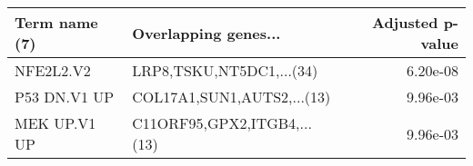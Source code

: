 \begin{tabular}{llr}
\toprule
Term name (7) &        Overlapping genes... &  Adjusted p-value \\
\midrule
    NFE2L2.V2 &    LRP8,TSKU,NT5DC1,...(34) &          6.20e-08 \\
 P53 DN.V1 UP &  COL17A1,SUN1,AUTS2,...(13) &          9.96e-03 \\
 MEK UP.V1 UP & C11ORF95,GPX2,ITGB4,...(13) &          9.96e-03 \\
\bottomrule
\end{tabular}
